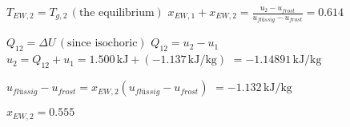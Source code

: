 \( T_{EW,2} = T_{g,2} \, (\text{the equilibrium}) \)  
\( x_{EW,1} + x_{EW,2} = \frac{u_2 - u_{frost}}{u_{flüssig} - u_{frost}} = 0.614 \)  

\( Q_{12} = \Delta U \, (\text{since isochoric}) \)  
\( Q_{12} = u_2 - u_1 \)  
\( u_2 = Q_{12} + u_1 = 1.500 \, \text{kJ} + (-1.137 \, \text{kJ/kg}) \)  
\( = -1.14891 \, \text{kJ/kg} \)  

\( u_{flüssig} - u_{frost} = x_{EW,2} (u_{flüssig} - u_{frost}) \)  
\( = -1.132 \, \text{kJ/kg} \)  

\( x_{EW,2} = 0.555 \)